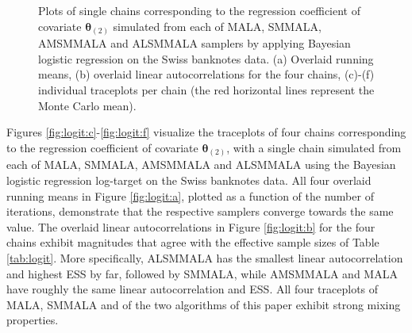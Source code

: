 \documentclass[twoside,11pt]{article}
\begin{document}
\begin{figure}[t]
{	} \\
	 \\
	\caption{
		Plots of single chains corresponding to the regression coefficient of covariate $\boldsymbol{\theta}_{(2)}$ 
		simulated from each of MALA, SMMALA, AMSMMALA and ALSMMALA samplers by applying Bayesian logistic regression on the 
		Swiss banknotes data. (a) Overlaid running means, (b) overlaid linear autocorrelations for the four chains, (c)-(f) 
		individual traceplots per chain (the red horizontal lines represent the Monte Carlo mean).
	}
	\label{fig:logit}
\end{figure}

Figures \ref{fig:logit:c}-\ref{fig:logit:f} visualize the traceplots of four chains corresponding to the regression 
coefficient of covariate $\boldsymbol{\theta}_{(2)}$, with a single chain simulated from each of MALA, SMMALA, AMSMMALA and 
ALSMMALA using the Bayesian logistic regression log-target on the Swiss banknotes data. All four overlaid running means in 
Figure \ref{fig:logit:a}, plotted as a function of the number of iterations, demonstrate that the respective samplers 
converge towards the same value. The overlaid linear autocorrelations in Figure \ref{fig:logit:b} for the four chains 
exhibit magnitudes that agree with the effective sample sizes of Table \ref{tab:logit}. More specifically, ALSMMALA has the 
smallest linear autocorrelation and highest ESS by far, followed by SMMALA, while AMSMMALA and MALA have roughly the same 
linear autocorrelation and ESS. All four traceplots of MALA, SMMALA and of the two algorithms of this paper exhibit strong 
mixing properties.
\end{document}

